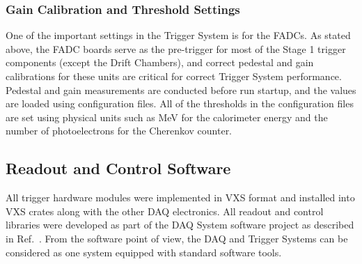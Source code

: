 \subsubsection{Gain Calibration and Threshold Settings}

One of the important settings in the Trigger System is for the FADCs. As stated above, the FADC boards serve as the pre-trigger for most of the Stage 1 trigger components (except the Drift Chambers), and correct pedestal and gain calibrations for these units are critical for correct Trigger System performance. Pedestal and gain measurements are conducted before run startup, and the values are loaded using configuration files. All of the thresholds in the configuration files are set using physical units such as MeV for the calorimeter energy and the number of photoelectrons for the Cherenkov counter.


\subsection{Readout and Control Software}

All trigger hardware modules were implemented in VXS format and installed into VXS crates along with the other DAQ electronics. All readout and control libraries were developed as part of the DAQ System software project as described in Ref.~\cite{daq-ref}. From the software point of view, the DAQ and Trigger Systems can be considered as one system equipped with standard software tools.